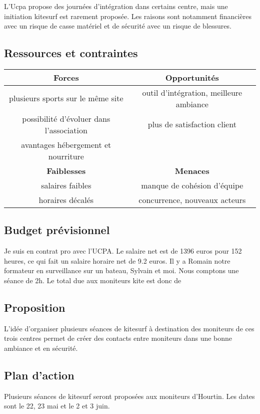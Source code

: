 \documentclass[12pt,a4paper]{report}
\begin{document}
L'Ucpa propose des journées d'intégration dans certains centre, mais
une initiation kitesurf est rarement proposée. Les raisons sont notamment
financières avec un risque de casse matériel
et de sécurité avec un risque de blessures.
\subsection{Ressources et contraintes}
\begin{tabular}{|c|c|}
        \hline
        \textbf{Forces}                          & \textbf{Opportunités} \\ 
        \hline
        plusieurs sports sur le m\^eme site      &  outil d'intégration, meilleure ambiance\\
        possibilité d'évoluer dans l'association & plus de satisfaction client  \\
        avantages hébergement et nourriture      &                              \\
        \hline
        \textbf{Faiblesses}                      &  \textbf{Menaces} \\ 
        \hline
        salaires faibles                         & manque de cohésion d'équipe \\
        horaires décalés                         & concurrence, nouveaux acteurs   \\
        \hline
\end{tabular}

\subsection{Budget prévisionnel}
Je suis en contrat pro avec l'UCPA. Le salaire net est de 1396 euros pour 152 heures, 
ce qui fait un salaire horaire net de 9.2 euros.
Il y a Romain notre formateur en surveillance sur un bateau, Sylvain et moi.
Nous comptons une séance de 2h. Le total due aux moniteurs kite est donc de
\subsection{Proposition}
L'idée d'organiser plusieurs séances de  kitesurf à destination des moniteurs
de ces trois centres permet  de créer des contacts 
entre moniteurs dans une bonne ambiance et en sécurité.

\subsection{Plan d'action}
Plusieurs séances de kitesurf seront proposées aux moniteurs d'Hourtin.
Les dates sont le 22, 23 mai et le 2 et 3 juin.
\end{document}
